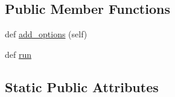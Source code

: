 \subsection*{Public Member Functions}
\begin{DoxyCompactItemize}
\item 
def \hyperlink{classpip_1_1__internal_1_1commands_1_1install_1_1InstallCommand_aaf86b3064749f8af89be6cfb1c216d46}{add\+\_\+options} (self)
\item 
def \hyperlink{classpip_1_1__internal_1_1commands_1_1install_1_1InstallCommand_a4dfdf816a466db054e5db3291192d16e}{run}
\end{DoxyCompactItemize}
\subsection*{Static Public Attributes}
